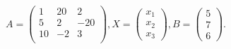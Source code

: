 \documentclass[12pt]{article}
\begin{document}
$ \begin{equation*}A=\begin{pmatrix}1 & 20 & 2 \\5 & 2 & -20 \\10 & -2 & 3 \\\end{pmatrix}, X=\begin{pmatrix}x_1 \\x_2 \\x_3\end{pmatrix}, B = \begin{pmatrix}5 \\7 \\6\end{pmatrix}.\end{equation*} $
\end{document}

